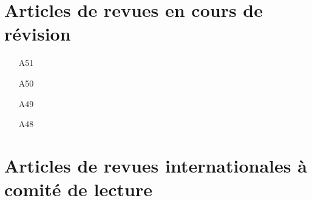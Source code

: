 \documentclass[9pt,french,a4paper,oneside]{article}%
\begin{document}
\section{Articles de revues en cours de révision}%
\begin{enumerate}

\item[A51] %

\item[A50] %

\item[A49] %

\item[A48] %

\end{enumerate}

\section{Articles de revues internationales à comité de lecture}%
\end{document}
